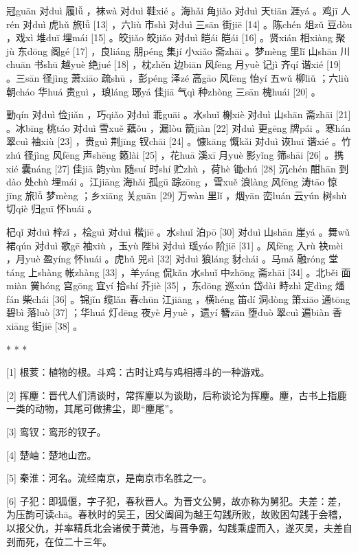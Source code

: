 \documentclass[12pt,UTF8]{ctexbook}
\begin{document}
冠guān 对duì 履lǚ ，袜wà 对duì 鞋xié 。海hǎi 角jiǎo 对duì 天tiān 涯yá 。鸡jī 人rén 对duì 虎hǔ 旅lǚ [13] ，六liù 市shì 对duì 三sān 街jiē [14] 。陈chén 俎zǔ 豆dòu ，戏xì 堆duī 埋mái [15] 。皎jiǎo 皎jiǎo 对duì 皑ái 皑ái [16] 。贤xián 相xiàng 聚jù 东dōng 阁gé [17] ，良liáng 朋péng 集jí 小xiǎo 斋zhāi 。梦mèng 里lǐ 山shān 川chuān 书shū 越yuè 绝jué [18] ，枕zhěn 边biān 风fēng 月yuè 记jì 齐qí 谐xié [19] 。三sān 径jìng 萧xiāo 疏shū ，彭péng 泽zé 高gāo 风fēng 怡yí 五wǔ 柳liǔ ；六liù 朝cháo 华huá 贵guì ，琅láng 琊yá 佳jiā 气qì 种zhòng 三sān 槐huái [20] 。

勤qín 对duì 俭jiǎn ，巧qiǎo 对duì 乖guāi 。水shuǐ 榭xiè 对duì 山shān 斋zhāi [21] 。冰bīng 桃táo 对duì 雪xuě 藕ǒu ，漏lòu 箭jiàn [22] 对duì 更gēng 牌pái 。寒hán 翠cuì 袖xiù [23] ，贵guì 荆jīng 钗chāi [24] 。慷kāng 慨kǎi 对duì 诙huī 谐xié 。竹zhú 径jìng 风fēng 声shēng 籁lài [25] ，花huā 溪xī 月yuè 影yǐng 筛shāi [26] 。携xié 囊náng [27] 佳jiā 韵yùn 随suí 时shí 贮zhù ，荷hè 锄chú [28] 沉chén 酣hān 到dào 处chù 埋mái 。江jiāng 海hǎi 孤gū 踪zōng ，雪xuě 浪làng 风fēng 涛tāo 惊jīng 旅lǚ 梦mèng ；乡xiāng 关guān [29] 万wàn 里lǐ ，烟yān 峦luán 云yún 树shù 切qiè 归guī 怀huái 。

杞qǐ 对duì 梓zǐ ，桧guì 对duì 楷jiē 。水shuǐ 泊pō [30] 对duì 山shān 崖yá 。舞wǔ 裙qún 对duì 歌gē 袖xiù ，玉yù 陛bì 对duì 瑶yáo 阶jiē [31] 。风fēng 入rù 袂mèi ，月yuè 盈yíng 怀huái 。虎hǔ 兕sì [32] 对duì 狼láng 豺chái 。马mǎ 融róng 堂táng 上shàng 帐zhàng [33] ，羊yáng 侃kǎn 水shuǐ 中zhōng 斋zhāi [34] 。北běi 面miàn 黉hóng 宫gōng 宜yí 拾shí 芥jiè [35] ，东dōng 巡xún 岱dài 畤zhì 定dìng 燔fán 柴chái [36] 。锦jǐn 缆lǎn 春chūn 江jiāng ，横héng 笛dí 洞dòng 箫xiāo 通tōng 碧bì 落luò [37] ；华huá 灯dēng 夜yè 月yuè ，遗yí 簪zān 堕duò 翠cuì 遍biàn 香xiāng 街jiē [38] 。



* * *



[1] 根荄：植物的根。斗鸡：古时让鸡与鸡相搏斗的一种游戏。

[2] 挥麈：晋代人们清谈时，常挥麈以为谈助，后称谈论为挥麈。麈，古书上指鹿一类的动物，其尾可做拂尘，即“麈尾”。

[3] 鸾钗：鸾形的钗子。

[4] 楚岫：楚地山峦。

[5] 秦淮：河名。流经南京，是南京市名胜之一。

[6] 子犯：即狐偃，字子犯，春秋晋人。为晋文公舅，故亦称为舅犯。夫差：差，为压韵可读chā。春秋时的吴王，因父阖闾为越王勾践所败，故败困勾践于会稽，以报父仇，并率精兵北会诸侯于黄池，与晋争霸，勾践乘虚而入，遂灭吴，夫差自刭而死，在位二十三年。
\end{document}
